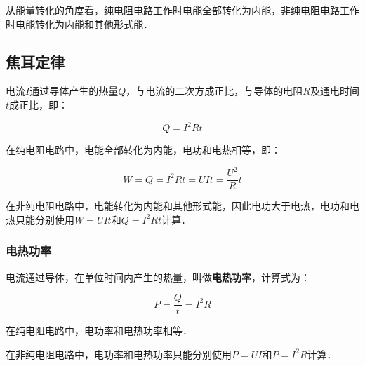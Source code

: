 从能量转化的角度看，纯电阻电路工作时电能全部转化为内能，非纯电阻电路工作时电能转化为内能和其他形式能．

\subsection{焦耳定律}

电流$I$通过导体产生的热量$Q$，与电流的二次方成正比，与导体的电阻$R$及通电时间$t$成正比，即：

\begin{equation}
Q=I^2Rt
\end{equation}

在纯电阻电路中，电能全部转化为内能，电功和电热相等，即：

\begin{equation}
W=Q=I^2Rt=UIt=\frac{U^2}{R}t
\end{equation}

在非纯电阻电路中，电能转化为内能和其他形式能，因此电功大于电热，电功和电热只能分别使用$W=UIt$和$Q=I^2Rt$计算．

\subsubsection{电热功率}

电流通过导体，在单位时间内产生的热量，叫做\textbf{电热功率}，计算式为：

\begin{equation}
P=\frac{Q}{t}=I^2R
\end{equation}

在纯电阻电路中，电功率和电热功率相等．

在非纯电阻电路中，电功率和电热功率只能分别使用$P=UI$和$P=I^2R$计算．
